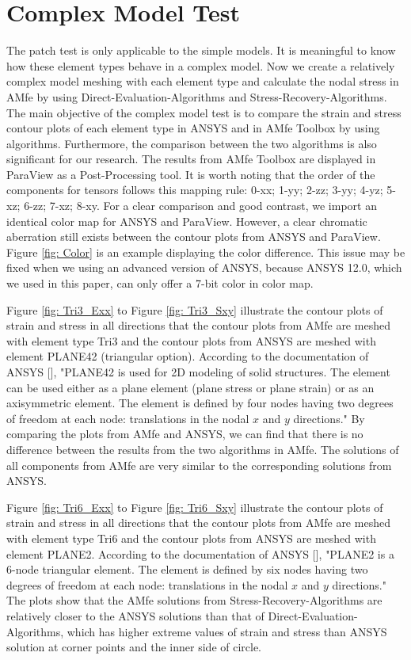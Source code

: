 \section{Complex Model Test}
The patch test is only applicable to the simple models. It is meaningful to know how these element types behave in a complex model. Now we create a relatively complex model meshing with each element type and calculate the nodal stress in AMfe by using Direct-Evaluation-Algorithms and Stress-Recovery-Algorithms. The main objective of the complex model test is to compare the strain and stress contour plots of each element type in ANSYS and in AMfe Toolbox by using algorithms. Furthermore, the comparison between the two algorithms is also significant for our research. The results from AMfe Toolbox are displayed in ParaView as a Post-Processing tool. It is worth noting that the order of the components for tensors follows this mapping rule: 0-xx; 1-yy; 2-zz;  3-yy; 4-yz; 5-xz; 6-zz; 7-xz; 8-xy. For a clear comparison and good contrast, we import an identical color map for ANSYS and ParaView. However, a clear chromatic aberration still exists between the contour plots from ANSYS and ParaView. Figure \ref{fig: Color} is an example displaying the color difference. This issue may be fixed when we using an advanced version of ANSYS, because ANSYS 12.0, which we used in this paper, can only offer a 7-bit color in color map. 

Figure \ref{fig: Tri3_Exx} to Figure \ref{fig: Tri3_Sxy} illustrate the contour plots of strain and stress in all directions that the contour plots from AMfe are meshed with element type Tri3 and the contour plots from ANSYS are meshed with element PLANE42 (triangular option). According to the documentation of ANSYS [\cite{APDL}], "PLANE42 is used for 2D modeling of solid structures. The element can be used either as a plane element (plane stress or plane strain) or as an axisymmetric element. The element is defined by four nodes having two degrees of freedom at each node: translations in the nodal $x$ and $y$ directions."
By comparing the plots from AMfe and ANSYS, we can find that there is no difference between the results from the two algorithms in AMfe. The solutions of all components from AMfe are very similar to the corresponding solutions from ANSYS. 

Figure \ref{fig: Tri6_Exx} to Figure \ref{fig: Tri6_Sxy} illustrate the contour plots of strain and stress in all directions that the contour plots from AMfe are meshed with element type Tri6 and the contour plots from ANSYS are meshed with element PLANE2. According to the documentation of ANSYS [\cite{APDL}], "PLANE2 is a 6-node triangular element. The element is defined by six nodes having two degrees of freedom at each node: translations in the nodal $x$ and $y$ directions." The plots show that the AMfe solutions from Stress-Recovery-Algorithms are relatively closer to the ANSYS solutions than that of Direct-Evaluation-Algorithms, which has higher extreme values of strain and stress than ANSYS solution at corner points and the inner side of circle. 

